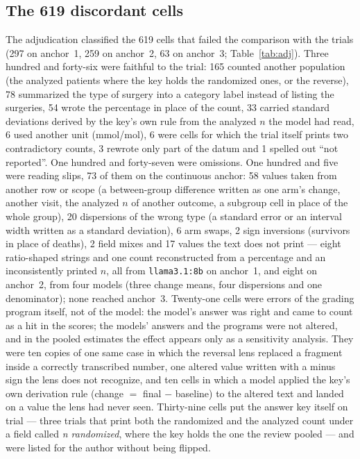 \documentclass[11pt]{article}
\begin{document}
\subsection{The 619 discordant cells}
\label{sec:cells}
The adjudication classified the 619 cells that failed the comparison with the trials (297 on anchor~1, 259 on anchor~2, 63 on anchor~3; Table~\ref{tab:adj}). Three hundred and forty-six were faithful to the trial: 165 counted another population (the analyzed patients where the key holds the randomized ones, or the reverse), 78 summarized the type of surgery into a category label instead of listing the surgeries, 54 wrote the percentage in place of the count, 33 carried standard deviations derived by the key's own rule from the analyzed $n$ the model had read, 6 used another unit (mmol/mol), 6 were cells for which the trial itself prints two contradictory counts, 3 rewrote only part of the datum and 1 spelled out ``not reported''. One hundred and forty-seven were omissions. One hundred and five were reading slips, 73 of them on the continuous anchor: 58 values taken from another row or scope (a between-group difference written as one arm's change, another visit, the analyzed $n$ of another outcome, a subgroup cell in place of the whole group), 20 dispersions of the wrong type (a standard error or an interval width written as a standard deviation), 6 arm swaps, 2 sign inversions (survivors in place of deaths), 2 field mixes and 17 values the text does not print --- eight ratio-shaped strings and one count reconstructed from a percentage and an inconsistently printed $n$, all from \texttt{llama3.1:8b} on anchor~1, and eight on anchor~2, from four models (three change means, four dispersions and one denominator); none reached anchor~3. Twenty-one cells were errors of the grading program itself, not of the model: the model's answer was right and came to count as a hit in the scores; the models' answers and the programs were not altered, and in the pooled estimates the effect appears only as a sensitivity analysis. They were ten copies of one same case in which the reversal lens replaced a fragment inside a correctly transcribed number, one altered value written with a minus sign the lens does not recognize, and ten cells in which a model applied the key's own derivation rule (change $=$ final $-$ baseline) to the altered text and landed on a value the lens had never seen. Thirty-nine cells put the answer key itself on trial --- three trials that print both the randomized and the analyzed count under a field called \emph{n randomized}, where the key holds the one the review pooled --- and were listed for the author without being flipped.
\end{document}
